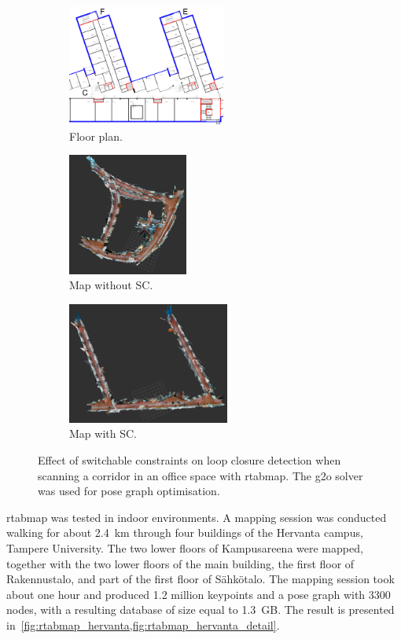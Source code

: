 \documentclass[11pt, letterpaper, twoside]{article}
\begin{document}
\begin{figure}[tb]
    \begin{subfigure}[t]{.34\textwidth}
        \centering
        \includegraphics[height=4cm]{corridor}
        \caption{Floor plan.}\label{fig:rtabmap_lc_floorplan}
    \end{subfigure}%
    \begin{subfigure}[t]{.19\textwidth}
        \centering
        \includegraphics[height=4cm]{rtabmap_without_sc.png}
        \caption{Map without SC.}\label{fig:rtabmap_lc_without_sc}
    \end{subfigure}%
    \begin{subfigure}[t]{.44\textwidth}
        \centering
        \includegraphics[height=4cm]{rtabmap_with_sc.png}
        \caption{Map with SC.}\label{fig:rtabmap_lc_with_sc}
    \end{subfigure}

    \caption{%
        Effect of switchable constraints on loop closure detection when
        scanning a corridor in an office space with \gls{rtabmap}. The g2o
        solver was used for pose graph optimisation.
    }\label{fig:rtabmap_lc}
\end{figure}

\gls{rtabmap} was tested in indoor environments. A mapping session was
conducted walking for about 2.4~km through four buildings of the Hervanta
campus, Tampere University. The two lower floors of Kampusareena were mapped,
together with the two lower floors of the main building, the first floor of
Rakennustalo, and part of the first floor of Sähkötalo. The mapping session
took about one hour and produced 1.2 million keypoints and a pose graph with
3300 nodes, with a resulting database of size equal to 1.3~GB. The result is
presented in~\cref{fig:rtabmap_hervanta,fig:rtabmap_hervanta_detail}.
\end{document}
